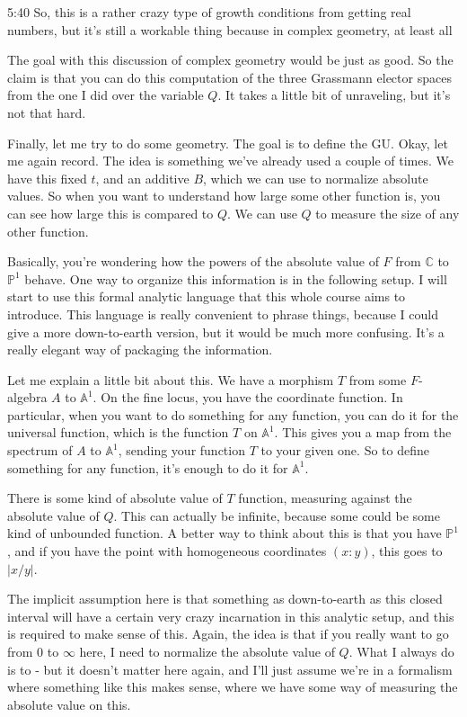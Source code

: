 \begin{unfinished}{5:40}
So, this is a rather crazy type of growth conditions from getting real numbers, but it's still a workable thing because in complex geometry, at least all

The goal with this discussion of complex geometry would be just as good. So the claim is that you can do this computation of the three Grassmann elector spaces from the one I did over the variable $Q$. It takes a little bit of unraveling, but it's not that hard.

Finally, let me try to do some geometry. The goal is to define the GU. Okay, let me again record. The idea is something we've already used a couple of times. We have this fixed $t$, and an additive $B$, which we can use to normalize absolute values. So when you want to understand how large some other function is, you can see how large this is compared to $Q$. We can use $Q$ to measure the size of any other function.

Basically, you're wondering how the powers of the absolute value of $F$ from $\mathbb{C}$ to $\mathbb{P}^1$ behave. One way to organize this information is in the following setup. I will start to use this formal analytic language that this whole course aims to introduce. This language is really convenient to phrase things, because I could give a more down-to-earth version, but it would be much more confusing. It's a really elegant way of packaging the information.

Let me explain a little bit about this. We have a morphism $T$ from some $F$-algebra $A$ to $\mathbb{A}^1$. On the fine locus, you have the coordinate function. In particular, when you want to do something for any function, you can do it for the universal function, which is the function $T$ on $\mathbb{A}^1$. This gives you a map from the spectrum of $A$ to $\mathbb{A}^1$, sending your function $T$ to your given one. So to define something for any function, it's enough to do it for $\mathbb{A}^1$.

There is some kind of absolute value of $T$ function, measuring against the absolute value of $Q$. This can actually be infinite, because some could be some kind of unbounded function. A better way to think about this is that you have $\mathbb{P}^1$, and if you have the point with homogeneous coordinates $(x:y)$, this goes to $|x/y|$.

The implicit assumption here is that something as down-to-earth as this closed interval will have a certain very crazy incarnation in this analytic setup, and this is required to make sense of this. Again, the idea is that if you really want to go from 0 to $\infty$ here, I need to normalize the absolute value of $Q$. What I always do is to - but it doesn't matter here again, and I'll just assume we're in a formalism where something like this makes sense, where we have some way of measuring the absolute value on this.


\end{unfinished}
